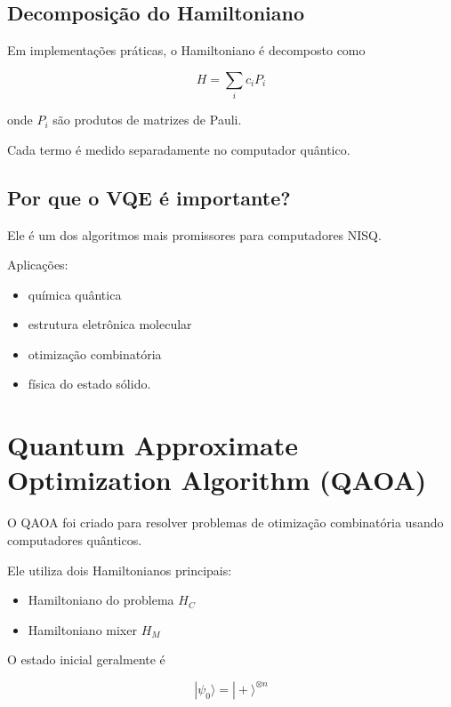 \documentclass[a4paper,12pt]{article}
\begin{document}
\subsection{Decomposição do Hamiltoniano}

Em implementações práticas, o Hamiltoniano é decomposto como

\begin{equation}
H = \sum_i c_i P_i
\end{equation}

onde $P_i$ são produtos de matrizes de Pauli.

Cada termo é medido separadamente no computador quântico.

\subsection{Por que o VQE é importante?}

Ele é um dos algoritmos mais promissores para computadores NISQ.

Aplicações:
\begin{itemize}
\item química quântica
\item estrutura eletrônica molecular
\item otimização combinatória
\item física do estado sólido.
\end{itemize}

\section{Quantum Approximate Optimization Algorithm (QAOA)}

\begin{tcolorbox}[colback=red!10,colframe=red!70!black,title=QAOA]
O QAOA foi criado para resolver problemas de otimização combinatória usando 
computadores qu\^anticos.
\end{tcolorbox}

Ele utiliza dois Hamiltonianos principais:

\begin{itemize}
\item Hamiltoniano do problema $H_C$
\item Hamiltoniano mixer $H_M$
\end{itemize}

O estado inicial geralmente é

\begin{equation}
|\psi_0\rangle = |+\rangle^{\otimes n}
\end{equation}
\end{document}
